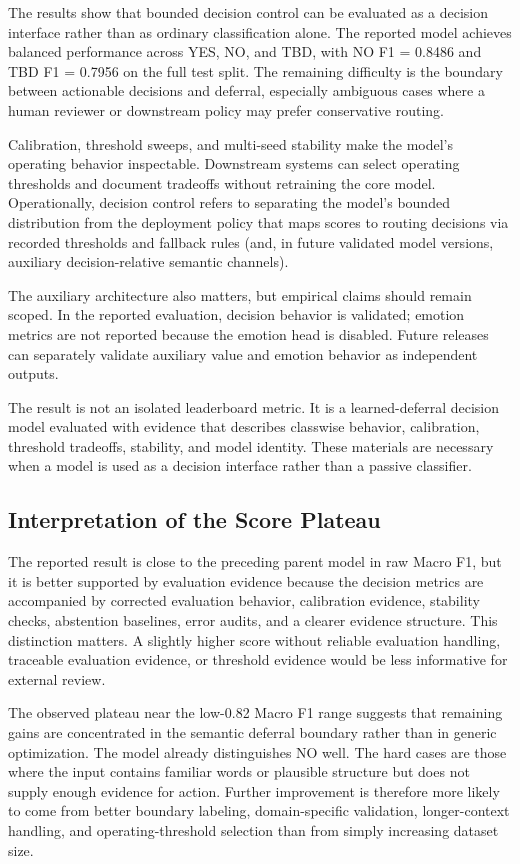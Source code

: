 \documentclass[11pt]{article}
\begin{document}
The results show that bounded decision control can be evaluated as a decision interface rather than as ordinary classification alone. The reported model achieves balanced performance across YES, NO, and TBD, with NO F1 = 0.8486 and TBD F1 = 0.7956 on the full test split. The remaining difficulty is the boundary between actionable decisions and deferral, especially ambiguous cases where a human reviewer or downstream policy may prefer conservative routing.

Calibration, threshold sweeps, and multi-seed stability make the model's operating behavior inspectable. Downstream systems can select operating thresholds and document tradeoffs without retraining the core model. Operationally, decision control refers to separating the model's bounded distribution from the deployment policy that maps scores to routing decisions via recorded thresholds and fallback rules (and, in future validated model versions, auxiliary decision-relative semantic channels).

The auxiliary architecture also matters, but empirical claims should remain scoped. In the reported evaluation, decision behavior is validated; emotion metrics are not reported because the emotion head is disabled. Future releases can separately validate auxiliary value and emotion behavior as independent outputs.

The result is not an isolated leaderboard metric. It is a learned-deferral decision model evaluated with evidence that describes classwise behavior, calibration, threshold tradeoffs, stability, and model identity. These materials are necessary when a model is used as a decision interface rather than a passive classifier.

\subsection{Interpretation of the Score Plateau}

The reported result is close to the preceding parent model in raw Macro F1, but it is better supported by evaluation evidence because the decision metrics are accompanied by corrected evaluation behavior, calibration evidence, stability checks, abstention baselines, error audits, and a clearer evidence structure. This distinction matters. A slightly higher score without reliable evaluation handling, traceable evaluation evidence, or threshold evidence would be less informative for external review.

The observed plateau near the low-0.82 Macro F1 range suggests that remaining gains are concentrated in the semantic deferral boundary rather than in generic optimization. The model already distinguishes NO well. The hard cases are those where the input contains familiar words or plausible structure but does not supply enough evidence for action. Further improvement is therefore more likely to come from better boundary labeling, domain-specific validation, longer-context handling, and operating-threshold selection than from simply increasing dataset size.
\end{document}
